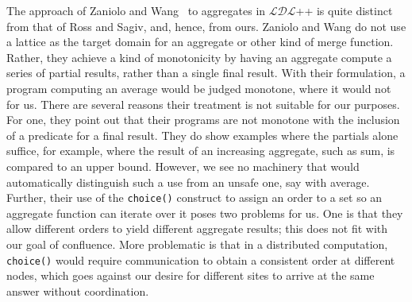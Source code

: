 The approach of Zaniolo and Wang~\cite{Zaniolo1999} to aggregates in
$\mathcal{LDL}$++ is quite distinct from that of Ross and Sagiv, and, hence,
from ours. Zaniolo and Wang do not use a lattice as the target domain for an
aggregate or other kind of merge function. Rather, they achieve a kind of
monotonicity by having an aggregate compute a series of partial results, rather
than a single final result. With their formulation, a program computing an
average would be judged monotone, where it would not for us. There are several
reasons their treatment is not suitable for our purposes. For one, they point
out that their programs are not monotone with the inclusion of a predicate for a
final result. They do show examples where the partials alone suffice, for
example, where the result of an increasing aggregate, such as sum, is compared
to an upper bound. However, we see no machinery that would automatically
distinguish such a use from an unsafe one, say with average. Further, their use
of the \texttt{choice()} construct to assign an order to a set so an aggregate
function can iterate over it poses two problems for us. One is that they allow
different orders to yield different aggregate results; this does not fit with
our goal of confluence. More problematic is that in a distributed computation,
\texttt{choice()} would require communication to obtain a consistent order at
different nodes, which goes against our desire for different sites to arrive at
the same answer without coordination.

